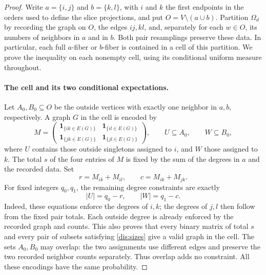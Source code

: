 \begin{proof}
Write $a=\{i,j\}$ and $b=\{k,l\}$, with $i$ and $k$ the first
endpoints in the orders used to define the slice projections, and put
$O=V\setminus(a\cup b)$. Partition $\Omega_d$ by recording the graph
on $O$, the edges $ij,kl$, and, separately for each $w\in O$, its
numbers of neighbors in $a$ and in $b$. Both pair resamplings preserve
these data. In particular, each full $a$-fiber or $b$-fiber is contained
in a cell of this partition. We prove the inequality on each nonempty
cell, using its conditional uniform measure throughout.

\paragraph{The cell and its two conditional expectations.}
Let $A_0,B_0\subseteq O$ be the outside vertices with exactly one
neighbor in $a,b$, respectively. A graph $G$ in the cell is encoded by
\[
 M=\begin{pmatrix}
       \mathbf 1_{\{ik\in E(G)\}}&\mathbf 1_{\{il\in E(G)\}}\\
       \mathbf 1_{\{jk\in E(G)\}}&\mathbf 1_{\{jl\in E(G)\}}
    \end{pmatrix},
 \qquad U\subseteq A_0,\qquad W\subseteq B_0,
\]
where $U$ contains those outside singletons assigned to $i$, and $W$
those assigned to $k$. The total $s$ of the four entries of $M$ is fixed
by the sum of the degrees in $a$ and the recorded data. Set
\[
 r=M_{ik}+M_{il},\qquad c=M_{ik}+M_{jk}.
\]
For fixed integers $q_0,q_1$, the remaining degree constraints are
exactly
\begin{equation}\label{dis:sizes}
 |U|=q_0-r,\qquad |W|=q_1-c.
\end{equation}
Indeed, these equations enforce the degrees of $i,k$; the degrees of
$j,l$ then follow from the fixed pair totals. Each outside degree is
already enforced by the recorded graph and counts. This also proves
that every binary matrix of total $s$ and every pair of subsets
satisfying \eqref{dis:sizes} give a valid graph in the cell. The sets
$A_0,B_0$ may overlap: the two assignments use different edges and
preserve the two recorded neighbor counts separately. Thus overlap
adds no constraint. All these encodings have the same probability.


\end{proof}
